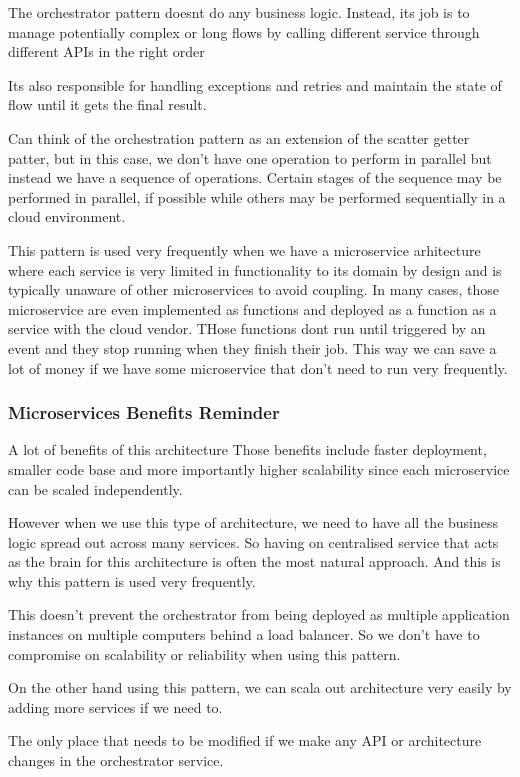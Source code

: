 The orchestrator pattern doesnt do any business logic.
Instead, its job is to manage potentially complex or long flows by calling different service through different APIs in the right order

Its also responsible for handling exceptions and retries and maintain the state of flow until it gets the final result.

Can think of the orchestration pattern as an extension of the scatter getter patter, but in this case, we don't have one operation to perform in parallel but instead we have a sequence of operations.
Certain stages of the sequence may be performed in parallel, if possible while others may be performed sequentially in a cloud environment.

This pattern is used very frequently when we have a microservice arhitecture where each service is very limited in functionality to its domain by design and is typically unaware of other microservices to avoid coupling.
In many cases, those microservice are even implemented as functions and deployed as a function as a service with the cloud vendor.
THose functions dont run until triggered by an event and they stop running when they finish their job.
This way we can save a lot of money if we have some microservice that don't need to run very frequently.

\subsubsection{Microservices Benefits Reminder}
A lot of benefits of this architecture
Those benefits include faster deployment, smaller code base and more importantly higher scalability since each microservice can be scaled independently.

However when we use this type of architecture, we need to have all the business logic spread out across many services.
So having on centralised service that acts as the brain for this architecture is often the most natural approach.
And this is why this pattern is used very frequently.

This doesn't prevent the orchestrator from being deployed as multiple application instances on multiple computers behind a load balancer.
So we don't have to compromise on scalability or reliability when using this pattern.

On the other hand using this pattern, we can scala out architecture very easily by adding more services if we need to.

The only place that needs to be modified if we make any API or architecture changes in the orchestrator service.

